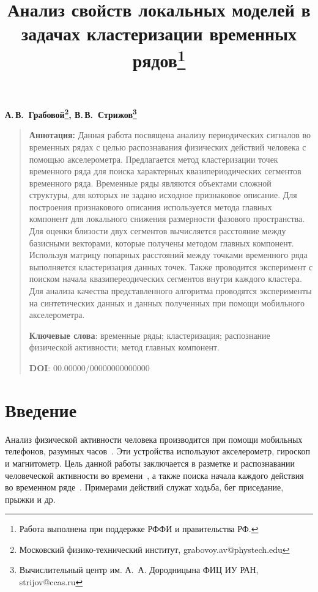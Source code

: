 \documentclass[12pt, twoside]{article}
\numberwithin{equation}{section}
\begin{document}
\title{\bf Анализ свойств локальных моделей в задачах кластеризации временных рядов\thanks{Работа выполнена при поддержке РФФИ и правительства РФ.}}
\date{}
\author{}
\maketitle

\begin{center}
\bf
А.\,В.~Грабовой\footnote{Московский физико-технический институт, grabovoy.av@phystech.edu}, В.\,В.~Стрижов\footnote{Вычислительный центр им. А.~А. Дородницына	ФИЦ ИУ РАН, strijov@ccas.ru}

\end{center}

{\centering\begin{quote}
\textbf{Аннотация:} Данная работа посвящена анализу периодических сигналов во временных рядах с целью распознавания физических действий человека с помощью акселерометра. Предлагается метод кластеризации точек временного ряда для поиска характерных квазипериодических сегментов временного ряда. Временные ряды являются объектами сложной структуры, для которых не задано исходное признаковое описание. Для построения признакового описания используется метода главных компонент для локального снижения размерности фазового пространства. Для оценки близости двух сегментов вычисляется расстояние между базисными векторами, которые получены методом главных компонент. Используя матрицу попарных расстояний между точками временного ряда выполняется кластеризация данных точек. Также проводится эксперимент с поиском начала квазипереодических сегментов внутри каждого кластера. Для анализа качества представленного алгоритма проводятся эксперименты на синтетических данных и данных полученных при помощи мобильного акселерометра.


\smallskip
\textbf{Ключевые слова}: временные ряды; кластеризация; распознание физической активности; метод главных компонент.

\smallskip
\textbf{DOI}: 00.00000/00000000000000
\end{quote}
}

\section{Введение}
Анализ физической активности человека производится при помощи мобильных телефонов, разумных часов~\cite{kwapisz2010, wang2014}. Эти устройства используют акселерометр, гироскоп и магнитометр. Цель данной работы заключается в  разметке и распознавании человеческой активности во времени~\cite{Ignatov2015, Olivares2012, cinar2018}, а также поиска начала каждого действия во временном ряде~\cite{motrenko2015}. Примерами действий служат ходьба, бег приседание, прыжки и др.
\end{document}
